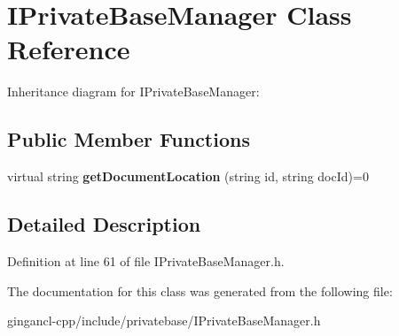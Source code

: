 \section{IPrivateBaseManager Class Reference}
\label{classbr_1_1pucrio_1_1telemidia_1_1ginga_1_1ncl_1_1IPrivateBaseManager}
Inheritance diagram for IPrivateBaseManager:\subsection*{Public Member Functions}
\begin{CompactItemize}
\item 
virtual string \textbf{getDocumentLocation} (string id, string docId)=0\label{classbr_1_1pucrio_1_1telemidia_1_1ginga_1_1ncl_1_1IPrivateBaseManager_c30f77b08a75285417d8aaa9f66b1970}

\end{CompactItemize}


\subsection{Detailed Description}




Definition at line 61 of file IPrivateBaseManager.h.

The documentation for this class was generated from the following file:\begin{CompactItemize}
\item 
gingancl-cpp/include/privatebase/IPrivateBaseManager.h\end{CompactItemize}
